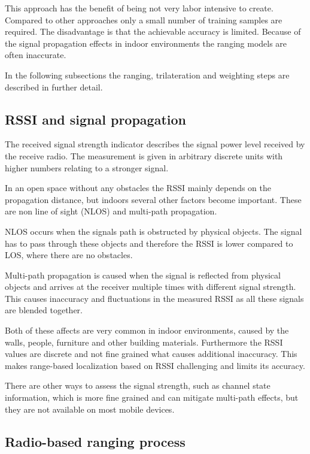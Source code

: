 This approach has the benefit of being not very labor intensive to create. Compared to other approaches only a small number of training samples are required. The disadvantage is that the achievable accuracy is limited. Because of the signal propagation effects in indoor environments the ranging models are often inaccurate.

In the following subsections the ranging, trilateration and weighting steps are described in further detail.

\subsection{RSSI and signal propagation}

The received signal strength indicator describes the signal power level received by the receive radio. The measurement is given in arbitrary discrete units with higher numbers relating to a stronger signal\citep{RSSIwikipedia}.

In an open space without any obstacles the RSSI mainly depends on the propagation distance, but indoors several other factors become important. These are non line of sight (NLOS) and multi-path propagation.

NLOS occurs when the signals path is obstructed by physical objects. The signal has to pass through these objects and therefore the RSSI is lower compared to LOS, where there are no obstacles\cite{JoseMaster}.

Multi-path propagation is caused when the signal is reflected from physical objects and arrives at the receiver multiple times with different signal strength. This causes inaccuracy and fluctuations in the measured RSSI as all these signals are blended together\cite{multipathEffects}.

Both of these affects are very common in indoor environments, caused by the walls, people, furniture and other building materials. Furthermore the RSSI values are discrete and not fine grained what causes additional inaccuracy. This makes range-based localization based on RSSI challenging and limits its accuracy.

There are other ways to assess the signal strength, such as channel state information, which is more fine grained and can mitigate multi-path effects, but they are not available on most mobile devices\cite{JoseMaster,FineGrainedIndoorTracking}.

\subsection{Radio-based ranging process}
\label{Ranging}

